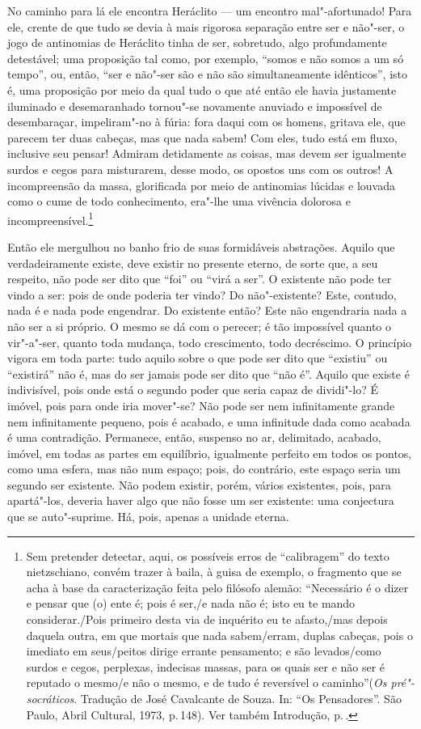 No caminho para lá ele encontra Heráclito --- um encontro mal"-afortunado! Para
ele, crente de que tudo se devia à mais rigorosa separação entre ser e
não"-ser, o jogo de antinomias de Heráclito tinha de ser, sobretudo, algo
profundamente detestável; uma proposição tal como, por exemplo, ``somos e não
somos a um só tempo'', ou, então, ``ser e não"-ser são e não são
simultaneamente idênticos'', isto é, uma proposição por meio da qual tudo o
que até então ele havia justamente iluminado e desemaranhado tornou"-se
novamente anuviado e impossível de desembaraçar, impeliram"-no à fúria: fora
daqui com os homens, gritava ele, que parecem ter duas cabeças, mas que nada
sabem! Com eles, tudo está em fluxo, inclusive seu pensar! Admiram
detidamente as coisas, mas devem ser igualmente surdos e cegos para
misturarem, desse modo, os opostos uns com os outros! A incompreensão da
massa, glorificada por meio de antinomias lúcidas e louvada como o cume de
todo conhecimento, era"-lhe uma vivência dolorosa e incompreensível.\footnote
{ Sem pretender detectar, aqui, os possíveis erros de ``calibragem'' do texto
nietzschiano, convém trazer à baila, à guisa de exemplo, o fragmento que se
acha à base da caracterização feita pelo filósofo alemão: ``Necessário é o
dizer e pensar que (o) ente é; pois é ser,/e nada não é; isto eu te mando
considerar./Pois primeiro desta via de inquérito eu te afasto,/mas depois
daquela outra, em que mortais que nada sabem/erram, duplas cabeças, pois o
imediato em seus/peitos dirige errante pensamento; e são levados/como surdos
e cegos, perplexas, indecisas massas, para os quais ser e não ser é reputado
o mesmo/e não o mesmo, e de tudo é reversível o caminho''(\textit{Os pré"-socráticos}. 
Tradução de José Cavalcante de Souza. In: ``Os
Pensadores''. São Paulo, Abril Cultural, 1973, p.\,148). Ver também
Introdução, p.\,\pageref{colli}.}

Então ele mergulhou no banho frio de suas formidáveis abstrações. Aquilo que
verdadeiramente existe, deve existir no presente eterno, de sorte que, a seu
respeito, não pode ser dito que ``foi'' ou ``virá a ser''. O existente não
pode ter vindo a ser: pois de onde poderia ter vindo? Do não"-existente?
Este, contudo, nada é e nada pode engendrar. Do existente então? Este não
engendraria nada a não ser a si próprio. O mesmo se dá com o perecer; é tão
impossível quanto o vir"-a"-ser, quanto toda mudança, todo crescimento, todo
decréscimo. O princípio vigora em toda parte: tudo aquilo sobre o que pode
ser dito que ``existiu'' ou ``existirá'' não é, mas do ser jamais pode ser
dito que ``não é''. Aquilo que existe é indivisível, pois onde está o segundo
poder que seria capaz de dividi"-lo? É imóvel, pois para onde iria mover"-se?
Não pode ser nem infinitamente grande nem infinitamente pequeno, pois é
acabado, e uma infinitude dada como acabada é uma contradição. Permanece,
então, suspenso no ar, delimitado, acabado, imóvel, em todas as partes em
equilíbrio, igualmente perfeito em todos os pontos, como uma esfera, mas não
num espaço; pois, do contrário, este espaço seria um segundo ser existente.
Não podem existir, porém, vários existentes, pois, para apartá"-los, deveria
haver algo que não fosse um ser existente: uma conjectura que se
auto"-suprime. Há, pois, apenas a unidade eterna.

